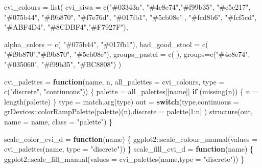 \documentclass[
]{article}
\newenvironment{Shaded}{\begin{snugshade}}{\end{snugshade}}
\newcommand{\AttributeTok}[1]{\textcolor[rgb]{0.77,0.63,0.00}{#1}}
\newcommand{\ControlFlowTok}[1]{\textcolor[rgb]{0.13,0.29,0.53}{\textbf{#1}}}
\newcommand{\DecValTok}[1]{\textcolor[rgb]{0.00,0.00,0.81}{#1}}
\newcommand{\FunctionTok}[1]{\textcolor[rgb]{0.00,0.00,0.00}{#1}}
\newcommand{\NormalTok}[1]{#1}
\newcommand{\OtherTok}[1]{\textcolor[rgb]{0.56,0.35,0.01}{#1}}
\newcommand{\SpecialCharTok}[1]{\textcolor[rgb]{0.00,0.00,0.00}{#1}}
\newcommand{\StringTok}[1]{\textcolor[rgb]{0.31,0.60,0.02}{#1}}
\begin{document}
\begin{Shaded}
\begin{Highlighting}[]
\NormalTok{cvi\_colours }\OtherTok{=} \FunctionTok{list}\NormalTok{(}
  \AttributeTok{cvi\_siwa =} \FunctionTok{c}\NormalTok{(}\StringTok{"\#03343a"}\NormalTok{, }\StringTok{"\#4e8e74"}\NormalTok{,}\StringTok{"\#f99b35"}\NormalTok{,  }\StringTok{"\#e5c217"}\NormalTok{,  }
               \StringTok{"\#075b44"}\NormalTok{, }\StringTok{"\#f9b870"}\NormalTok{, }\StringTok{"\#f7e76d"}\NormalTok{, }
                  \StringTok{"\#017fb1"}\NormalTok{, }\StringTok{"\#5cb08e"}\NormalTok{ , }\StringTok{"\#fcd8b6"}\NormalTok{, }\StringTok{"\#fcf5cd"}\NormalTok{, }\StringTok{"\#ABF4D4"}\NormalTok{,}
               \StringTok{"\#8CDBF4"}\NormalTok{,}\StringTok{"\#F7927F"}\NormalTok{),}
  
  \AttributeTok{alpha\_colors =} \FunctionTok{c}\NormalTok{( }\StringTok{"\#075b44"}\NormalTok{,  }\StringTok{"\#017fb1"}\NormalTok{),}
  \AttributeTok{bad\_good\_stool =} \FunctionTok{c}\NormalTok{( }\StringTok{"\#f9b870"}\NormalTok{,}\StringTok{"\#f9b870"}\NormalTok{, }\StringTok{"\#5cb08e"}\NormalTok{),}
  \AttributeTok{groups\_pastel =} \FunctionTok{c}\NormalTok{( ), }
  \AttributeTok{groups=}\FunctionTok{c}\NormalTok{(}\StringTok{"\#4e8e74"}\NormalTok{, }\StringTok{"\#035060"}\NormalTok{, }\StringTok{"\#f99b35"}\NormalTok{, }\StringTok{"\#BC8808"}\NormalTok{)}
\NormalTok{)}

\NormalTok{cvi\_palettes }\OtherTok{=} \ControlFlowTok{function}\NormalTok{(name, n, }\AttributeTok{all\_palettes =}\NormalTok{ cvi\_colours, }\AttributeTok{type =} \FunctionTok{c}\NormalTok{(}\StringTok{"discrete"}\NormalTok{, }\StringTok{"continuous"}\NormalTok{)) \{}
\NormalTok{  palette }\OtherTok{=}\NormalTok{ all\_palettes[[name]]}
  \ControlFlowTok{if}\NormalTok{ (}\FunctionTok{missing}\NormalTok{(n)) \{}
\NormalTok{    n }\OtherTok{=} \FunctionTok{length}\NormalTok{(palette)}
\NormalTok{  \}}
\NormalTok{  type }\OtherTok{=} \FunctionTok{match.arg}\NormalTok{(type)}
\NormalTok{  out }\OtherTok{=} \ControlFlowTok{switch}\NormalTok{(type,}\AttributeTok{continuous =}\NormalTok{ grDevices}\SpecialCharTok{::}\FunctionTok{colorRampPalette}\NormalTok{(palette)(n),}\AttributeTok{discrete =}\NormalTok{ palette[}\DecValTok{1}\SpecialCharTok{:}\NormalTok{n]}
\NormalTok{  )}
  \FunctionTok{structure}\NormalTok{(out, }\AttributeTok{name =}\NormalTok{ name, }\AttributeTok{class =} \StringTok{"palette"}\NormalTok{)}
\NormalTok{\}}

\NormalTok{scale\_color\_cvi\_d }\OtherTok{=} \ControlFlowTok{function}\NormalTok{(name) \{}
\NormalTok{  ggplot2}\SpecialCharTok{::}\FunctionTok{scale\_colour\_manual}\NormalTok{(}\AttributeTok{values =} \FunctionTok{cvi\_palettes}\NormalTok{(name, }\AttributeTok{type =} \StringTok{"discrete"}\NormalTok{))}
\NormalTok{\}}
\NormalTok{scale\_fill\_cvi\_d }\OtherTok{=} \ControlFlowTok{function}\NormalTok{(name) \{}
\NormalTok{  ggplot2}\SpecialCharTok{::}\FunctionTok{scale\_fill\_manual}\NormalTok{(}\AttributeTok{values =} \FunctionTok{cvi\_palettes}\NormalTok{(name,}\AttributeTok{type =} \StringTok{"discrete"}\NormalTok{))}
\NormalTok{\}}
\end{Highlighting}
\end{Shaded}
\end{document}
